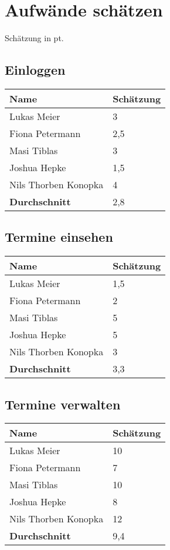 
\clearpage

\section{Aufwände schätzen}
Schätzung in pt.

\vspace{18pt}

\subsection{Einloggen}
\begin{tabular} {|p{5cm}|p{}|}
	\hline
	Name & Schätzung \\
	\hline
	Lukas Meier 
	& 3 \\
	\hline
	Fiona Petermann 
	& 2,5 \\
	\hline
	Masi Tiblas 
	& 3 \\
	\hline
	Joshua Hepke
	& 1,5 \\
	\hline
	Nils Thorben Konopka
	& 4 \\
	\hline \hline
	\textbf{Durchschnitt}
	& 2,8 \\
	\hline
\end{tabular}

\newpage

\subsection{Termine einsehen}
\begin{tabular} {|p{5cm}|p{}|}
	\hline
	Name & Schätzung \\
	\hline
	Lukas Meier 
	& 1,5 \\
	\hline
	Fiona Petermann 
	& 2 \\
	\hline
	Masi Tiblas 
	& 5 \\
	\hline
	Joshua Hepke
	& 5 \\
	\hline
	Nils Thorben Konopka
	& 3 \\
	\hline \hline
	\textbf{Durchschnitt}
	& 3,3 \\
	\hline
\end{tabular}

\newpage

\subsection{Termine verwalten}
\begin{tabular} {|p{5cm}|p{}|}
	\hline
	Name & Schätzung \\
	\hline
	Lukas Meier 
	& 10 \\
	\hline
	Fiona Petermann 
	& 7 \\
	\hline
	Masi Tiblas 
	& 10 \\
	\hline
	Joshua Hepke
	& 8 \\
	\hline
	Nils Thorben Konopka
	& 12 \\
	\hline \hline
	\textbf{Durchschnitt}
	& 9,4 \\
	\hline
\end{tabular}

